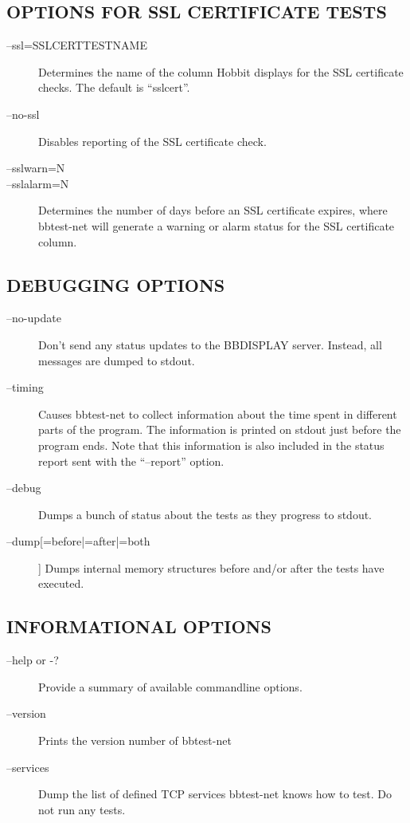 \subsection{OPTIONS FOR SSL CERTIFICATE TESTS}
\begin{description}
\item[--ssl=SSLCERTTESTNAME] Determines the name of the column Hobbit
  displays for the SSL certificate checks. The default is
  ``sslcert''. 

\item[--no-ssl] Disables reporting of the SSL certificate check. 

 

\item[--sslwarn=N]
\item[--sslalarm=N] Determines the number of days before an SSL
  certificate expires, where bbtest-net will generate a warning or
  alarm status for the SSL certificate column. 



\end{description}
\subsection{DEBUGGING OPTIONS}
\begin{description}
\item[--no-update] Don't send any status updates to the BBDISPLAY
  server. Instead, all messages are dumped to stdout. 



\item[--timing] Causes bbtest-net to collect information about the
  time spent in different parts of the program. The information is
  printed on stdout just before the program ends. Note that this
  information is also included in the status report sent with the
  ``--report'' option. 


\item[--debug] Dumps a bunch of status about the tests as they progress to stdout. 

 

\item[--dump[=before|=after|=both]] Dumps internal memory structures
  before and/or after the tests have executed. 


 
\end{description}
\subsection{INFORMATIONAL OPTIONS}
\begin{description}
\item[--help or -?] Provide a summary of available commandline options. 

 

\item[--version] Prints the version number of bbtest-net 

 

\item[--services] Dump the list of defined TCP services bbtest-net
  knows how to test. Do not run any tests. 



\end{description}

